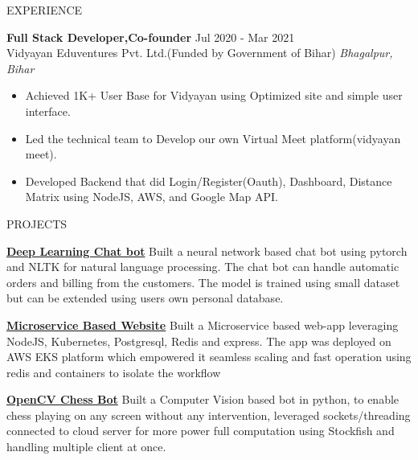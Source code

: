 \documentclass{resume} %
\begin{document}
\begin{rSection}{EXPERIENCE}
 
\textbf{Full Stack Developer,Co-founder} \hfill Jul 2020 - Mar 2021\\
Vidyayan Eduventures Pvt. Ltd.(Funded by Government of Bihar) \hfill \textit{Bhagalpur, Bihar}
 \begin{itemize}
    \itemsep -3pt {} 
     \item Achieved 1K+ User Base for Vidyayan  using Optimized site and simple user interface.
     \item Led the technical team to Develop our own Virtual Meet platform(vidyayan meet).
    \item Developed Backend that did Login/Register(Oauth), Dashboard, Distance Matrix using NodeJS, AWS, and Google Map API. 
 \end{itemize}

\end{rSection} 


\begin{rSection}{PROJECTS}
\vspace{-1.25em}
\item \textbf{\href{https://github.com/7dpk/pytorch-simple-chatbot}{Deep Learning Chat bot}} {Built a neural network based chat bot using pytorch and NLTK for natural language processing. The chat bot can handle automatic orders and billing from the customers. The model is trained using small dataset but can be extended using users own personal database.}
\item \textbf{\href{https://github.com/7dpk/k8s-express-node-redis-postgres}{Microservice Based Website}} {Built a Microservice based web-app leveraging NodeJS, Kubernetes, Postgresql, Redis and express. The app was deployed on AWS EKS platform which empowered it seamless scaling and fast operation using redis and containers to isolate the workflow }
\item \textbf{\href{https://github.com/kapeed7/chess_bot}{OpenCV Chess Bot}} { Built a Computer Vision based bot in python, to enable chess playing on any screen without any intervention, leveraged sockets/threading connected to cloud server for more power full computation using Stockfish and handling multiple client at once. }
\end{rSection} 
\end{document}
